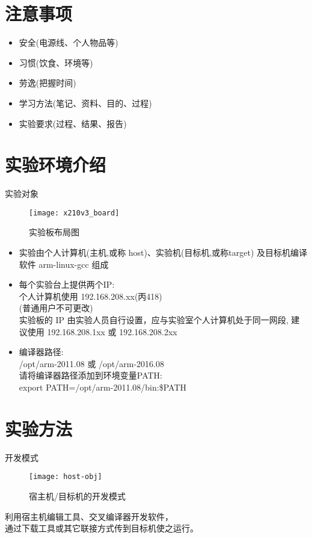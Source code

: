 \chapter{注意事项}{}
\begin{itemize}
  \item 安全(电源线、个人物品等)
  \item 习惯(饮食、环境等)
  \item 劳逸(把握时间)
  \item 学习方法(笔记、资料、目的、过程)
  \item 实验要求(过程、结果、报告)
\end{itemize}
\endslide

\chapter{实验环境介绍}{实验对象}
\begin{figure}
\centering
  \texttt{[image: x210v3\_board]}
\caption{实验板布局图}
\end{figure}
\endslide

\begin{itemize}
  \item 实验由个人计算机(主机,或称 host)、实验机(目标机,或称target)
		及目标机编译软件 arm-linux-gcc 组成
  \item 每个实验台上提供两个IP:\\
        个人计算机使用 192.168.208.xx(丙418)\\
		(普通用户不可更改)\\
		实验板的 IP 由实验人员自行设置，应与实验室个人计算机处于同一网段,
        建议使用 192.168.208.1xx 或 192.168.208.2xx
  \item 编译器路径:\\
        /opt/arm-2011.08 或 /opt/arm-2016.08\\
		请将编译器路径添加到环境变量PATH:\\
		export PATH=/opt/arm-2011.08/bin:\$PATH
\end{itemize}
\endslide

\chapter{实验方法}{开发模式}
\begin{figure}
\centering
  \texttt{[image: host-obj]}
\caption{宿主机/目标机的开发模式}
\end{figure}

利用宿主机编辑工具、交叉编译器开发软件，\\
通过下载工具或其它联接方式传到目标机使之运行。
\endslide

